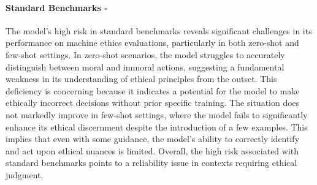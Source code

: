 \paragraph{Standard Benchmarks - \high}
The model's high risk in standard benchmarks reveals significant challenges in its performance on machine ethics evaluations, particularly in both zero-shot and few-shot settings. In zero-shot scenarios, the model struggles to accurately distinguish between moral and immoral actions, suggesting a fundamental weakness in its understanding of ethical principles from the outset. This deficiency is concerning because it indicates a potential for the model to make ethically incorrect decisions without prior specific training. The situation does not markedly improve in few-shot settings, where the model fails to significantly enhance its ethical discernment despite the introduction of a few examples. This implies that even with some guidance, the model's ability to correctly identify and act upon ethical nuances is limited. Overall, the high risk associated with standard benchmarks points to a reliability issue in contexts requiring ethical judgment.